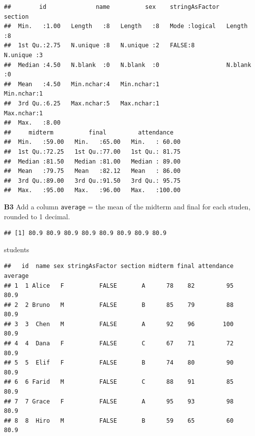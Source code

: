\documentclass[
]{article}
\newenvironment{Shaded}{\begin{snugshade}}{\end{snugshade}}
\newcommand{\AttributeTok}[1]{\textcolor[rgb]{0.13,0.29,0.53}{#1}}
\newcommand{\DecValTok}[1]{\textcolor[rgb]{0.00,0.00,0.81}{#1}}
\newcommand{\FunctionTok}[1]{\textcolor[rgb]{0.13,0.29,0.53}{\textbf{#1}}}
\newcommand{\NormalTok}[1]{#1}
\newcommand{\OtherTok}[1]{\textcolor[rgb]{0.56,0.35,0.01}{#1}}
\newcommand{\SpecialCharTok}[1]{\textcolor[rgb]{0.81,0.36,0.00}{\textbf{#1}}}
\begin{document}
\begin{verbatim}
##        id              name          sex    stringAsFactor       section 
##  Min.   :1.00   Length   :8   Length   :8   Mode :logical   Length   :8  
##  1st Qu.:2.75   N.unique :8   N.unique :2   FALSE:8         N.unique :3  
##  Median :4.50   N.blank  :0   N.blank  :0                   N.blank  :0  
##  Mean   :4.50   Min.nchar:4   Min.nchar:1                   Min.nchar:1  
##  3rd Qu.:6.25   Max.nchar:5   Max.nchar:1                   Max.nchar:1  
##  Max.   :8.00                                                            
##     midterm          final         attendance    
##  Min.   :59.00   Min.   :65.00   Min.   : 60.00  
##  1st Qu.:72.25   1st Qu.:77.00   1st Qu.: 81.75  
##  Median :81.50   Median :81.00   Median : 89.00  
##  Mean   :79.75   Mean   :82.12   Mean   : 86.00  
##  3rd Qu.:89.00   3rd Qu.:91.50   3rd Qu.: 95.75  
##  Max.   :95.00   Max.   :96.00   Max.   :100.00
\end{verbatim}

\textbf{B3} Add a column \texttt{average} = the mean of the midterm and
final for each studen, rounded to 1 decimal.

\begin{Shaded}
\end{Shaded}

\begin{verbatim}
## [1] 80.9 80.9 80.9 80.9 80.9 80.9 80.9 80.9
\end{verbatim}

\begin{Shaded}
\begin{Highlighting}[]
\NormalTok{students}
\end{Highlighting}
\end{Shaded}

\begin{verbatim}
##   id  name sex stringAsFactor section midterm final attendance average
## 1  1 Alice   F          FALSE       A      78    82         95    80.9
## 2  2 Bruno   M          FALSE       B      85    79         88    80.9
## 3  3  Chen   M          FALSE       A      92    96        100    80.9
## 4  4  Dana   F          FALSE       C      67    71         72    80.9
## 5  5  Elif   F          FALSE       B      74    80         90    80.9
## 6  6 Farid   M          FALSE       C      88    91         85    80.9
## 7  7 Grace   F          FALSE       A      95    93         98    80.9
## 8  8  Hiro   M          FALSE       B      59    65         60    80.9
\end{verbatim}
\end{document}
